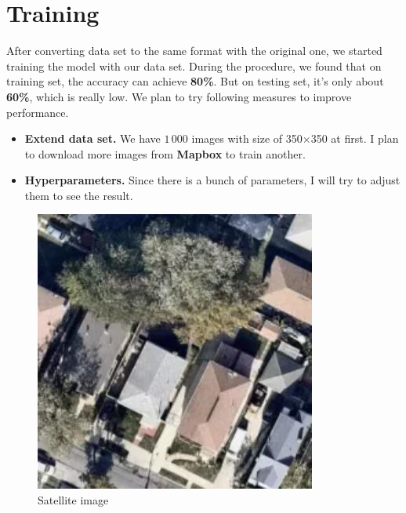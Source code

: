 \documentclass[]{IEEEtran}
\begin{document}
\section{Training}
	After converting data set to the same format with the original one, we started training the model with our data set. During the procedure, we found that on training set, the accuracy can achieve \textbf{80\%}. But on testing set, it's only about \textbf{60\%}, which is really low. We plan to try following measures to improve performance.
	\begin{itemize}
		\item \textbf{Extend data set.} We have $1\,000$ images with size of 350$\times$350 at first. I plan to download more images from \textbf{Mapbox} to train another.
		\item \textbf{Hyperparameters.} Since there is a bunch of parameters, I will try to adjust them to see the result. 
	\end{itemize}

	\begin{figure}[!hbt]
		\begin{center}
		\includegraphics[width=\columnwidth]{SAT01-00000}
		\caption{Satellite image}
		\label{fig:sat}
		\end{center}
	\end{figure}
\end{document}
